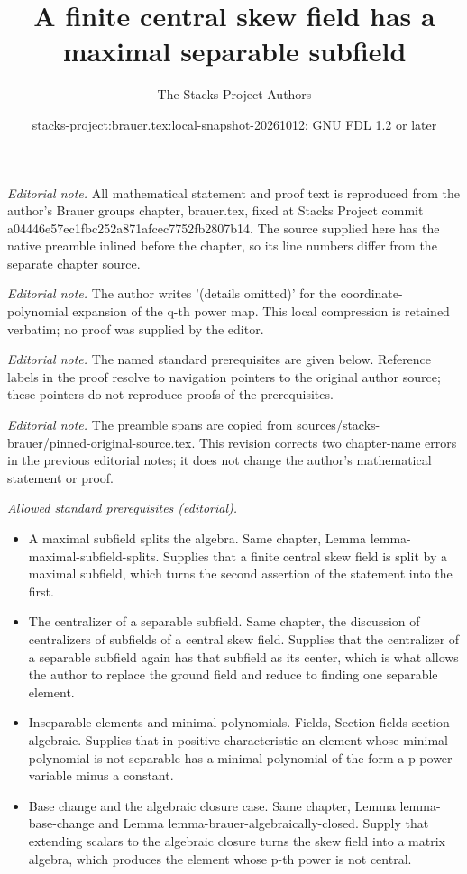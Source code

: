 \documentclass[10pt,a4paper]{amsart}
\title{A finite central skew field has a maximal separable subfield}
\author{The Stacks Project Authors}
\date{stacks-project:brauer.tex:local-snapshot-20261012; GNU FDL 1.2 or later}
\theoremstyle{plain}
\theoremstyle{definition}
\theoremstyle{remark}
\numberwithin{equation}{subsection}
\begin{document}
\maketitle
\noindent\textit{Editorial note.} All mathematical statement and proof text is reproduced from the author's Brauer groups chapter, brauer.tex, fixed at Stacks Project commit a04446e57ec1fbc252a871afcec7752fb2807b14. The source supplied here has the native preamble inlined before the chapter, so its line numbers differ from the separate chapter source.\par\medskip
\noindent\textit{Editorial note.} The author writes '(details omitted)' for the coordinate-polynomial expansion of the q-th power map. This local compression is retained verbatim; no proof was supplied by the editor.\par\medskip
\noindent\textit{Editorial note.} The named standard prerequisites are given below. Reference labels in the proof resolve to navigation pointers to the original author source; these pointers do not reproduce proofs of the prerequisites.\par\medskip
\noindent\textit{Editorial note.} The preamble spans are copied from sources/stacks-brauer/pinned-original-source.tex. This revision corrects two chapter-name errors in the previous editorial notes; it does not change the author's mathematical statement or proof.\par\medskip
\noindent\textit{Allowed standard prerequisites (editorial).}\begin{itemize}
\item A maximal subfield splits the algebra. Same chapter, Lemma lemma-maximal-subfield-splits. Supplies that a finite central skew field is split by a maximal subfield, which turns the second assertion of the statement into the first.
\item The centralizer of a separable subfield. Same chapter, the discussion of centralizers of subfields of a central skew field. Supplies that the centralizer of a separable subfield again has that subfield as its center, which is what allows the author to replace the ground field and reduce to finding one separable element.
\item Inseparable elements and minimal polynomials. Fields, Section fields-section-algebraic. Supplies that in positive characteristic an element whose minimal polynomial is not separable has a minimal polynomial of the form a p-power variable minus a constant.
\item Base change and the algebraic closure case. Same chapter, Lemma lemma-base-change and Lemma lemma-brauer-algebraically-closed. Supply that extending scalars to the algebraic closure turns the skew field into a matrix algebra, which produces the element whose p-th power is not central.
\end{itemize}\medskip
\end{document}
